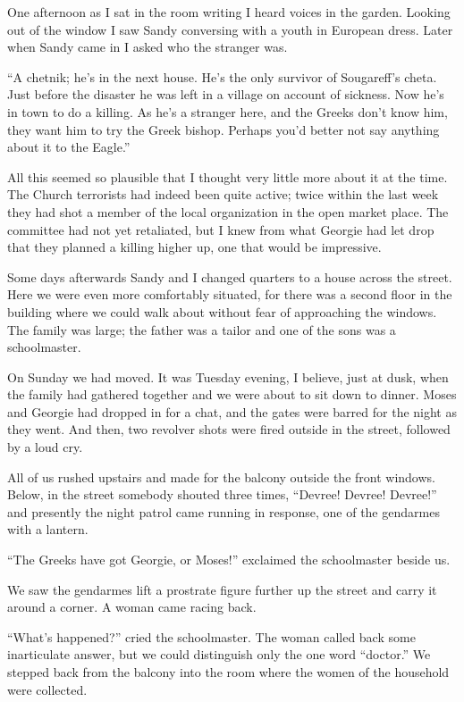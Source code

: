 \documentclass[a5paper,12pt]{book}
\begin{document}
One afternoon as I sat in the room writing I heard voices in the garden. Looking out of the window I saw Sandy conversing with a youth in European dress. Later when Sandy came in I asked who the stranger was.

“A chetnik; he’s in the next house. He’s the only survivor of Sougareff’s cheta. Just before the disaster he was left in a village on account of sickness. Now he’s in town to do a killing. As he’s a stranger here, and the Greeks don’t know him, they want him to try the Greek bishop. Perhaps you’d better not say anything about it to the Eagle.”

All this seemed so plausible that I thought very little more about it at the time. The Church terrorists had indeed been quite active; twice within the last week they had shot a member of the local organization in the open market place. The committee had not yet retaliated, but I knew from what Georgie had let drop that they planned a killing higher up, one that would be impressive.

Some days afterwards Sandy and I changed quarters to a house across the street. Here we were even more comfortably situated, for there was a second floor in the building where we could walk about without fear of approaching the windows. The family was large; the father was a tailor and one of the sons was a schoolmaster.

On Sunday we had moved. It was Tuesday evening, I believe, just at dusk, when the family had gathered together and we were about to sit down to dinner. Moses and Georgie had dropped in for a chat, and the gates were barred for the night as they went. And then, two revolver shots were fired outside in the street, followed by a loud cry.

All of us rushed upstairs and made for the balcony outside the front windows. Below, in the street somebody shouted three times, “Devree! Devree! Devree!” and presently the night patrol came running in response, one of the gendarmes with a lantern.

“The Greeks have got Georgie, or Moses!” exclaimed the schoolmaster beside us.

We saw the gendarmes lift a prostrate figure further up the street and carry it around a corner. A woman came racing back.

“What’s happened?” cried the schoolmaster. The woman called back some inarticulate answer, but we could distinguish only the one word “doctor.” We stepped back from the balcony into the room where the women of the household were collected.
\end{document}
